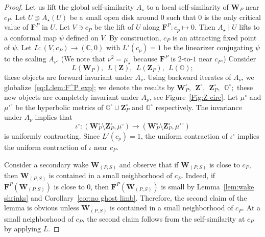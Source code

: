 \documentclass{amsart}
\renewcommand{\sp}{{\ \ }}
\newcommand{\1}{{\mathbb 1 }}
\newcommand{\bO}{{\mathbb{O}}}
\newcommand{\bF}{{\mathbf F}}
\newcommand{\bZ}{{\mathbf Z}}
\newcommand{\bW}{{\mathbf W}}
\newcommand{\str}{{\star}}
\newcommand{\C}{\mathbb{C}}
\theoremstyle{remark}
\numberwithin{equation}{section}
\theoremstyle{definition}
\theoremstyle{nonumberbreak}
\begin{document}
\begin{proof}
 Let us lift the global self-similarity $A_\str$ to a local self-similarity of $\bW_P$ near $c_P$. Let $U\Supset A_\str(U)$ be a small open disk around $0$ such that $0$ is the only critical value of $\bF^P$ in $U$. Let $V\ni c_P$ be the lift of $U$ along $\bF^P\colon c_p\mapsto 0$. Then $A_\str\mid U$ lifts to a conformal map $\psi$ defined on $V$. By construction, $c_P$ is an attracting fixed point of $\psi$. Let $L\colon (V,c_P)\to (\C,0)$ with $L'(c_p)=1$ be the linearizer conjugating  $\psi$ to the scaling $A_\nu$. (We note that $\nu^2=\mu_\str$ because $\bF^P$ is $2$-to-$1$ near $c_P$.) Consider 
\begin{equation}
\label{eq:L:lem:F^P exp}
L(\bW_P), \sp L(\bZ),\sp  L(\bZ_P),\sp L(\bO);
\end{equation}
 these objects are forward invariant under $A_\nu$. Using backward iterates of $A_\nu$, we globalize~\eqref{eq:L:lem:F^P exp}; we denote the results by $\bW_P^\circ,\sp \bZ^\circ,\sp \bZ_P^\circ, \sp \bO^\circ;$ these new objects are completely invariant under $A_\nu$, see Figure~\ref{Fig:Z circ}. Let $\mu^\circ$ and $\mu'^\circ$ be the hyperbolic metrics of $\bO^\circ \cup \bZ^\circ_P$ and $\bO^\circ $ respectively. The invariance under $A_\nu$ implies that
\[ \iota^\circ \colon (\bW^\circ_P\setminus \bZ^\circ_P,\mu^\circ)\to (\bW^\circ_P\setminus \bZ^\circ_P,\mu'^\circ)\]
is uniformly contracting. Since $L'(c_p)=1$, the uniform contraction of $\iota^\circ$ implies the uniform contraction of $\iota$ near $c_P$. 
 
Consider a secondary wake $\bW_{(P,S)}$ and observe that if $\bW_{(P,S)}$ is close to $c_P$, then $\bW_{(P,S)}$ is contained in a small neighborhood of $c_P$. Indeed, if $\bF^P(\bW_{(P,S)})$ is close to $0$, then $\bF^P(\bW_{(P,S)})$ is small by Lemma~\ref{lem:wake shrinks} and Corollary~\ref{cor:no ghost limb}. Therefore, the second claim of the lemma is obvious unless $\bW_{(P,S)}$ is contained in a small neighborhood of $c_P$. At a small neighborhood of $c_P$, the second claim follows from the self-similarity at $c_P$ by applying $L$.
\end{proof}
\end{document}
